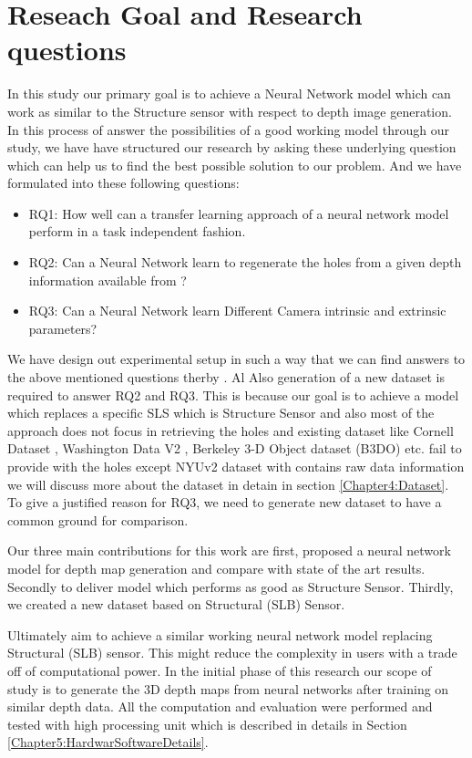 \section{Reseach Goal and Research questions}
In this study our primary goal is to achieve a Neural Network model which can work as similar to the Structure sensor with respect to depth image generation. In this process of answer the possibilities of a good working model through our study, we have have structured our research by asking these underlying question which can help us to find the best possible solution to our problem. And we have formulated into these following questions:

\begin{itemize}
    \item RQ1: How well can a transfer learning approach of a neural network model perform in a task independent fashion.
    \item RQ2: Can a Neural Network learn to regenerate the holes from a given depth information available from ?
    \item RQ3: Can a Neural Network learn Different Camera intrinsic and extrinsic parameters?  
\end{itemize}

We have design out experimental setup in such a way that we can find answers to the above mentioned questions therby . Al Also generation of a new dataset is required to answer RQ2 and RQ3. This is because our goal is to achieve a model which replaces a specific SLS which is Structure Sensor and also most of the approach does not focus in retrieving the holes and existing dataset like Cornell Dataset \cite{3Dscene} , Washington Data V2 \cite{Washington}, Berkeley 3-D Object dataset (B3DO) \cite{Janoch:EECS-2012-85} etc. fail to provide with the holes except NYUv2 dataset with contains raw data information we will discuss more about the dataset in detain in section \ref{Chapter4:Dataset}. To give a justified reason for RQ3, we need to generate new dataset to have a common ground for comparison. 

Our three main contributions for this work are first, proposed a neural network model for depth map generation and compare with state of the art results. Secondly to deliver model which performs as good as Structure Sensor. Thirdly,  we created a new dataset based on Structural (SLB) Sensor.

Ultimately aim to achieve a similar working neural network model replacing Structural (SLB) sensor. This might reduce the complexity in users with a trade off of computational power. In the initial phase of this research our scope of study is to generate the 3D depth maps from neural networks after training on similar depth data. All the computation and evaluation were performed and tested with high processing unit which is described in details in Section \ref{Chapter5:HardwarSoftwareDetails}.


